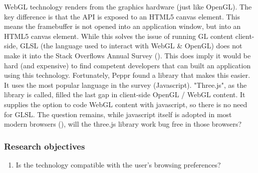 WebGL technology renders from the graphics hardware (just like OpenGL). The key difference is that the API is exposed to an HTML5 canvas element. This means the framebuffer is not opened into an application window, but into an HTML5 canvas element. While this solves the issue of running GL content client-side, GLSL (the language used to interact with WebGL \& OpenGL) does not make it into the Stack Overflows Annual Survey (\cite{stackoverflowDeveloperSurvey}). This does imply it would be hard (and expensive) to find competent developers that can built an application using this technology.
Fortunately, Peppr found a library that makes this easier. It uses the most popular language in the survey (Javascript). "Three.js", as the library is called, filled the last gap in client-side OpenGL / WebGL content. It supplies the option to code WebGL content with javascript, so there is no need for GLSL. The question remains, while javascript itself is adopted in most modern browsers (\cite{javascriptSupport}), will the three.js library work bug free in those browsers?

\subsubsection{Research objectives}
\begin{enumerate}
	\item {Is the technology compatible with the user's browsing preferences?}
\end{enumerate}


\newpage





